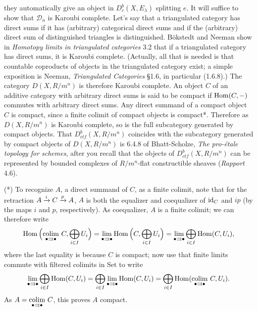 \documentclass[deligne.tex]{subfiles}
\begin{document}
they automatically give an object in $D_c^b(X,E_\lambda)$ splitting $e$.
It will suffice to show that $\mathcal D_n$ is Karoubi complete.
Let's say that a triangulated category has direct sums if it has
(arbitrary) categorical direct sums and if the (arbitrary) direct sum of
distinguished triangles is distinguished.
B\"okstedt and Neeman show in \emph{Homotopy limits in triangulated categories} 3.2
that if a triangulated category has direct sums, it is Karoubi complete.
(Actually, all that is needed is that countable coproducts of objects in
the triangulated category exist; a simple exposition is Neeman,
\emph{Triangulated Categories} \S1.6, in particular (1.6.8).)
The category $D(X,R/m^n)$ is therefore Karoubi complete.
An object $C$ of an additive category with arbitrary direct sums is said to
be compact if $\operatorname{Hom}(C,-)$ commutes with arbitrary direct sums.
Any direct summand of a compact object $C$ is compact, since a finite
colimit of compact objects is compact*.
Therefore as $D(X,R/m^n)$ is Karoubi complete, so
is the full subcategory generated by compact objects.
That $D_{ctf}^b(X,R/m^n)$ coincides with the subcategory generated by
compact objects of $D(X,R/m^n)$ is 6.4.8 of Bhatt-Scholze,
\emph{The pro-étale topology for schemes}, after you recall that the
objects of $D^b_{ctf}(X,R/m^n)$ can be represented by bounded complexes
of $R/m^n$-flat constructible sheaves (\emph{Rapport} 4.6).

(*) To recognize $A$, a direct summand of $C$, as a finite colimit, note
that for the retraction $A\xrightarrow i C\xrightarrow p A$, $A$ is both the 
equalizer and coequalizer of $\operatorname{id}_C$ and $ip$ (by the maps $i$ and $p$,
respectively). As coequalizer, $A$ is a finite colimit; we can 
therefore write
\begin{equation*}
	\Hom\Big(\underset{\bullet\rightrightarrows\bullet}{\colim}\ C,\bigoplus_{i\in I}U_i\Big)
	=\lim_{\bullet\rightrightarrows\bullet}\Hom\Big(C,\bigoplus_{i\in I}U_i\Big)
	=\lim_{\bullet\rightrightarrows\bullet}\bigoplus_{i\in I}\Hom(C,U_i),
\end{equation*}
where the last equality is because $C$ is compact; now use that finite 
limits commute with filtered colimits in Set to write
\begin{equation*}
	\lim_{\bullet\rightrightarrows\bullet}\bigoplus_{i\in I}\Hom(C,U_i)
	=\bigoplus_{i\in I}\lim_{\bullet\rightrightarrows\bullet}\Hom(C,U_i)
	=\bigoplus_{i\in I}\Hom(\underset{\bullet\rightrightarrows\bullet}{\colim}\ C,U_i).
\end{equation*}
As $A=\underset{\bullet\rightrightarrows\bullet}{\colim}\ C$, this proves
$A$ compact.
\end{document}
